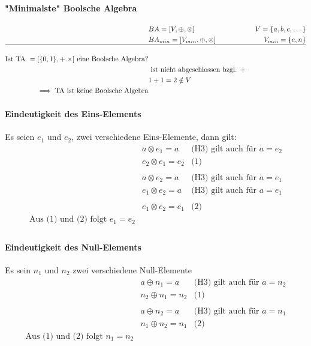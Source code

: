 \documentclass[a4paper]{scrartcl}
\begin{document}
				\paragraph{"Minimalste" Boolsche Algebra}
				\begin{align*}
					&BA = [V, \oplus , \otimes ] & V = \{ a,b,c, \dots \} \\
					&BA_{min} = [V_{min}, \oplus , \otimes ] & V_{min} = \{e, n\}\\ \hline
					\\
					\text{Ist TA }= [ \{0,1\}, +. \times ] \text{ eine Boolsche Algebra?}\\
					&\text{ ist nicht abgeschlossen bzgl. + }\\
					&1 + 1 = 2 \notin V\\ 
					\implies \text{TA ist keine Boolsche Algebra} &\\
				\end{align*}
				
				\paragraph{Eindeutigkeit des Eins-Elements}
				Es seien \(e_1\) und \(e_2\), zwei verschiedene Eins-Elemente, dann gilt:
				\begin{align*}
						&a \otimes e_1 = a &  \text{(H3) gilt auch für } a = e_2\\
						&e_2 \otimes e_1 = e_2 &\text{(1)}\\
						\\
						& a \otimes e_2 = a & \text{(H3) gilt auch für } a = e_1\\
						&e_1 \otimes e_2 = a & \text{(H3) gilt auch für } a = e_1\\
						\\
						&e_1 \otimes e_2 = e_1 &\text{(2)} \\
						\text{Aus (1) und (2) folgt } e_1 = e_2&\\
				\end{align*}
				
				\paragraph{Eindeutigkeit des Null-Elements}
				Es sein \(n_1\) und \(n_2\) zwei verschiedene Null-Elemente
				\begin{align*}
					&a \oplus n_1 = a & \text{(H3) gilt auch für } a = n_2\\
					&n_2 \oplus n_1 = n_2 &\text{(1)}\\
					\\
					& a \oplus n_2 = a & \text{(H3) gilt auch für } a = n_1\\
					& n_1 \oplus n_2 = n_1 & \text{(2)}\\
					\text{Aus (1) und (2) folgt } n_1 = n_2\\
				\end{align*}
				
\end{document}
